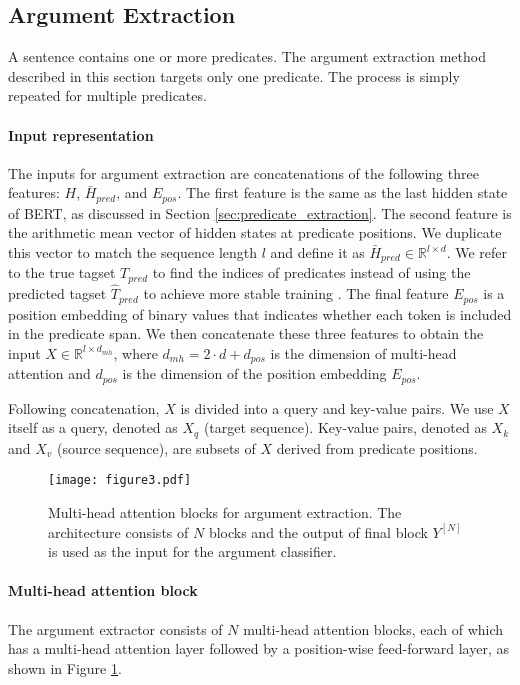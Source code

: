 \documentclass[11pt,a4paper]{article}
\begin{document}
\subsection{Argument Extraction}
\label{sec:argument_extraction}
A sentence contains one or more predicates.
The argument extraction method described in this section targets only one predicate. The process is simply repeated for multiple predicates.

\paragraph{Input representation}
The inputs for argument extraction are concatenations of the following three features: $H$, $\bar{H}_{pred}$, and $E_{pos}$.
The first feature is the same as the last hidden state of BERT, as discussed in Section \ref{sec:predicate_extraction}.
The second feature is the arithmetic mean vector of hidden states at predicate positions.
We duplicate this vector to match the sequence length $l$ and define it as $\bar{H}_{pred}\in\mathbb{R}^{l \times d}$.
We refer to the true tagset $T_{pred}$ to find the indices of predicates instead of using the predicted tagset $\hat{T}_{pred}$ to achieve more stable training \citep{6795228}.
The final feature $E_{pos}$ is a position embedding of binary values that indicates whether each token is included in the predicate span.
We then concatenate these three features to obtain the input $X\in\mathbb{R}^{l \times d_{mh}}$, where $d_{mh}=2 \cdot d + d_{pos}$ is the dimension of multi-head attention and $d_{pos}$ is the dimension of the position embedding $E_{pos}$.

Following concatenation, $X$ is divided into a query and key-value pairs.
We use $X$ itself as a query, denoted as $X_q$ (target sequence).
Key-value pairs, denoted as $X_k$ and $X_v$ (source sequence), are subsets of $X$ derived from predicate positions.

\begin{figure}[t]
\centering
\texttt{[image: figure3.pdf]}
\caption
{
Multi-head attention blocks for argument extraction.
The architecture consists of $N$ blocks and the output of final block $Y^{[N]}$ is used as the input for the argument classifier.
}
\label{fig:3}
\end{figure}

\paragraph{Multi-head attention block}
The argument extractor consists of $N$ multi-head attention blocks, each of which has a multi-head attention layer followed by a position-wise feed-forward layer, as shown in Figure \ref{fig:3}.
\end{document}
